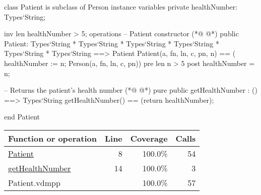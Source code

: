\begin{vdmpp}[breaklines=true]
class Patient is subclass of Person
instance variables
  private healthNumber: Types`String;
  
  inv len healthNumber > 5;
operations
 -- Patient constructor
(*@
\label{Patient:8}
@*)
 public Patient: Types`String * Types`String * Types`String * Types`String * Types`String * Types`String ==> Patient
  Patient(a, fn, ln, c, pn, n) == ( healthNumber := n; Person(a, fn, ln, c, pn))
 pre len n > 5
 post healthNumber = n;
 
 -- Returns the patient's health number
(*@
\label{getHealthNumber:14}
@*)
 pure public getHealthNumber : () ==> Types`String
  getHealthNumber() == (return healthNumber);

end Patient
\end{vdmpp}
\bigskip
\begin{longtable}{|l|r|r|r|}
\hline
Function or operation & Line & Coverage & Calls \\
\hline
\hline
\hyperref[Patient:8]{Patient} & 8&100.0\% & 54 \\
\hline
\hyperref[getHealthNumber:14]{getHealthNumber} & 14&100.0\% & 3 \\
\hline
\hline
Patient.vdmpp & & 100.0\% & 57 \\
\hline
\end{longtable}


